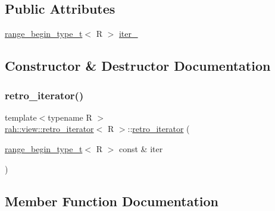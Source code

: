\subsection*{Public Attributes}
\begin{DoxyCompactItemize}
\item 
\mbox{\hyperlink{namespacerah_a28aff4eeddcece6be65ff0b956d32d4a}{range\+\_\+begin\+\_\+type\+\_\+t}}$<$ R $>$ \mbox{\hyperlink{structrah_1_1view_1_1retro__iterator_a8c21328b89b978842df7951af4022393}{iter\+\_\+}}
\end{DoxyCompactItemize}


\subsection{Constructor \& Destructor Documentation}
\mbox{\label{structrah_1_1view_1_1retro__iterator_ad7369163c4bbabf1e8699fd5ec8f96c8}} 
\subsubsection{\texorpdfstring{retro\_iterator()}{retro\_iterator()}}
{\footnotesize\ttfamily template$<$typename R $>$ \\
\mbox{\hyperlink{structrah_1_1view_1_1retro__iterator}{rah\+::view\+::retro\+\_\+iterator}}$<$ R $>$\+::\mbox{\hyperlink{structrah_1_1view_1_1retro__iterator}{retro\+\_\+iterator}} (\begin{DoxyParamCaption}\item[{\mbox{\hyperlink{namespacerah_a28aff4eeddcece6be65ff0b956d32d4a}{range\+\_\+begin\+\_\+type\+\_\+t}}$<$ R $>$ const \&}]{iter }\end{DoxyParamCaption})\hspace{0.3cm}{\ttfamily [inline]}}



\subsection{Member Function Documentation}
\mbox{\label{structrah_1_1view_1_1retro__iterator_a5f70f5e51fe8e6c47cbeac7c8fa2a9d2}} 
